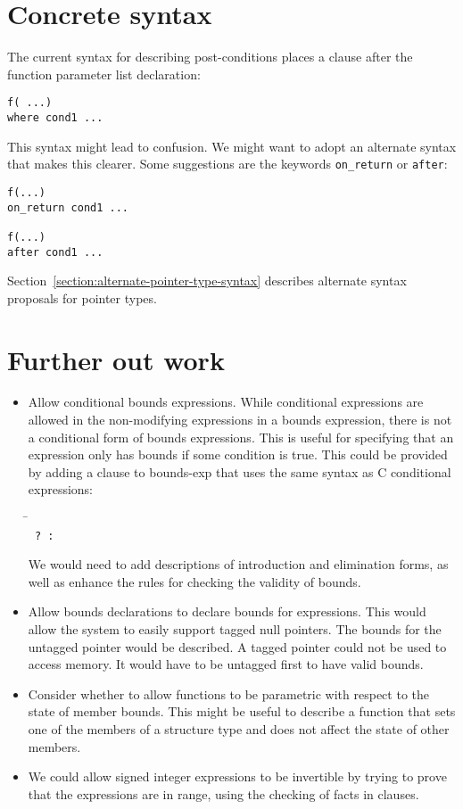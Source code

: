 \section{Concrete syntax}
 
The current syntax for describing post-conditions places a 
clause after the function parameter list declaration:

\begin{lstlisting}
f( ...)
where cond1 ...
\end{lstlisting}

This syntax might lead to confusion. We might want to adopt an alternate
syntax that makes this clearer. Some suggestions are the keywords
\texttt{on\_return} or \texttt{after}:

\begin{lstlisting}
f(...)
on_return cond1 ...

f(...)
after cond1 ...
\end{lstlisting}

Section~\ref{section:alternate-pointer-type-syntax} describes alternate
syntax proposals for pointer types.

\section{Further out work}
\begin{itemize}
\item Allow conditional bounds expressions.   While conditional
expressions are allowed in the non-modifying expressions in a bounds expression, 
there is not a conditional form of bounds expressions.  This is useful for
specifying that an expression only has bounds if some condition is true.
This could be provided by adding a clause to bounds-exp that uses the
same syntax as C conditional expressions:
\begin{tabbing}
\= \\
\>\texttt{ ?  : }
\end{tabbing}

We would need to add descriptions of introduction and elimination
forms, as well as enhance the rules for checking the validity of bounds.

\item Allow bounds declarations to declare bounds for expressions.
This would allow the system to easily support tagged null pointers.
The bounds for the untagged pointer would be described. 
A tagged pointer could not be used to access memory.  It would have to be
untagged first  to have valid bounds.

\item Consider whether to allow functions to be
parametric with respect to the state of member bounds. This might be
useful to describe a function that sets one of the members of a
structure type and does not affect the state of other members.

\item We could allow signed integer expressions to be invertible
by trying to prove that the expressions are in range, using the
checking of facts in  clauses.
\end{itemize}

